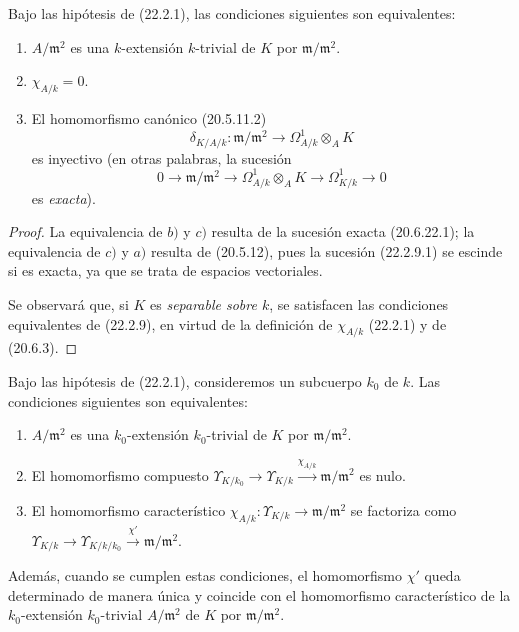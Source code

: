 \begin{proposition}[22.2.9]
\label{0.22.2.9-fr}
Bajo las hipótesis de \textup{(22.2.1)}, las condiciones siguientes son equivalentes:
\begin{enumerate}
  \item[\textup{a)}] $A/\mathfrak m^2$ es una $k$-extensión $k$-trivial de $K$ por
  $\mathfrak m/\mathfrak m^2$.
  \item[\textup{b)}] $\chi_{A/k}=0$.
  \item[\textup{c)}] El homomorfismo canónico \textup{(20.5.11.2)}
  \[
    \delta_{K/A/k}:\mathfrak m/\mathfrak m^2
    \longrightarrow\Omega^1_{A/k}\otimes_AK
  \]
  es inyectivo \textup{(en otras palabras, la sucesión}
  \begin{equation}
  \tag{22.2.9.1}
  \label{0.22.2.9.1-fr}
    0\longrightarrow\mathfrak m/\mathfrak m^2
    \longrightarrow\Omega^1_{A/k}\otimes_AK
    \longrightarrow\Omega^1_{K/k}\longrightarrow0
  \end{equation}
  \textup{es \emph{exacta})}.
\end{enumerate}
\end{proposition}

\begin{proof}
La equivalencia de $b)$ y $c)$ resulta de la sucesión exacta (20.6.22.1); la
equivalencia de $c)$ y $a)$ resulta de (20.5.12), pues la sucesión (22.2.9.1) se
escinde si es exacta, ya que se trata de espacios vectoriales.

Se observará que, si $K$ es \emph{separable sobre $k$}, se satisfacen las
condiciones equivalentes de (22.2.9), en virtud de la definición de
$\chi_{A/k}$ (22.2.1) y de (20.6.3).
\end{proof}

\begin{corollary}[22.2.10]
\label{0.22.2.10-fr}
Bajo las hipótesis de \textup{(22.2.1)}, consideremos un subcuerpo $k_0$ de $k$. Las
condiciones siguientes son equivalentes:
\begin{enumerate}
  \item[\textup{a)}] $A/\mathfrak m^2$ es una $k_0$-extensión $k_0$-trivial de $K$
  por $\mathfrak m/\mathfrak m^2$.
  \item[\textup{b)}] El homomorfismo compuesto
  $\Upsilon_{K/k_0}\longrightarrow\Upsilon_{K/k}\xrightarrow{\chi_{A/k}}\mathfrak m/\mathfrak m^2$
  es nulo.
  \item[\textup{c)}] El homomorfismo característico
  $\chi_{A/k}:\Upsilon_{K/k}\to\mathfrak m/\mathfrak m^2$ se factoriza como
  $\Upsilon_{K/k}\longrightarrow\Upsilon_{K/k/k_0}\xrightarrow{\chi'}\mathfrak m/\mathfrak m^2$.
\end{enumerate}
Además, cuando se cumplen estas condiciones, el homomorfismo $\chi'$ queda
determinado de manera única y coincide con el homomorfismo característico de
la $k_0$-extensión $k_0$-trivial $A/\mathfrak m^2$ de $K$ por
$\mathfrak m/\mathfrak m^2$.
\end{corollary}


